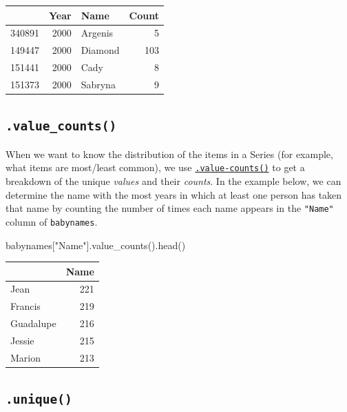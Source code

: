 \documentclass[
  letterpaper,
  DIV=11,
  numbers=noendperiod]{scrreprt}
\newenvironment{Shaded}{\begin{snugshade}}{\end{snugshade}}
\newcommand{\NormalTok}[1]{\textcolor[rgb]{0.00,0.23,0.31}{#1}}
\newcommand{\StringTok}[1]{\textcolor[rgb]{0.13,0.47,0.30}{#1}}
\begin{document}
\begin{tabular}{lrlr}
\toprule
{} &  Year &     Name &  Count \\
\midrule
340891 &  2000 &  Argenis &      5 \\
149447 &  2000 &  Diamond &    103 \\
151441 &  2000 &     Cady &      8 \\
151373 &  2000 &  Sabryna &      9 \\
\bottomrule
\end{tabular}

\hypertarget{value_counts}{%
\subsection{\texorpdfstring{\texttt{.value\_counts()}}{.value\_counts()}}\label{value_counts}}

When we want to know the distribution of the items in a Series (for
example, what items are most/least common), we use
\href{https://pandas.pydata.org/docs/reference/api/pandas.Series.value_counts.html}{\texttt{.value-counts()}}
to get a breakdown of the unique \emph{values} and their \emph{counts}.
In the example below, we can determine the name with the most years in
which at least one person has taken that name by counting the number of
times each name appears in the \texttt{"Name"} column of
\texttt{babynames}.

\begin{Shaded}
\begin{Highlighting}[]
\NormalTok{babynames[}\StringTok{"Name"}\NormalTok{].value\_counts().head()}
\end{Highlighting}
\end{Shaded}

\begin{tabular}{lr}
\toprule
{} &  Name \\
\midrule
Jean      &   221 \\
Francis   &   219 \\
Guadalupe &   216 \\
Jessie    &   215 \\
Marion    &   213 \\
\bottomrule
\end{tabular}

\hypertarget{unique}{%
\subsection{\texorpdfstring{\texttt{.unique()}}{.unique()}}\label{unique}}
\end{document}
